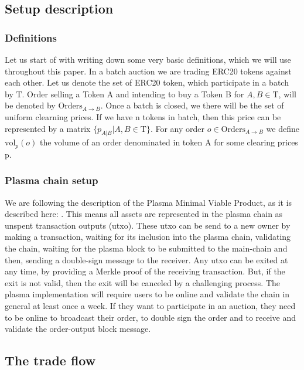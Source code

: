 \documentclass[11pt,parskip=full]{scrartcl}%
\newcommand{\Tau}{\mathrm{T}}
\begin{document}
\subsection{Setup description}

\subsubsection{Definitions}
Let us start of with writing down some very basic definitions, which we will use throughout this paper.
In a batch auction we are trading ERC20 tokens against each other. Let us denote the set of ERC20 token, which participate in a batch by $\Tau$. \newline
Order selling a Token A and intending to buy a Token B for $A,B\in \Tau$, will be denoted by $\text{Orders}_{A\rightarrow B}$. \newline
Once a batch is closed, we there will be the set of uniform clearning prices. If we have n tokens in batch, then this price can be represented by a matrix $\{p_{A|B}| A,B \in \Tau \}$. \newline
For any order $o \in \text{Orders}_{A\rightarrow B}$ we define $\text{vol}_p(o)$ the volume of an order denominated in token A for some clearing prices p.

\subsubsection{Plasma chain setup}
We are following the description of the Plasma Minimal Viable Product, as it is described here: \cite{MVP}. This means all assets are represented in the plasma chain as unspent transaction outputs (utxo). These utxo can be send to a new owner by making a transaction, waiting for its inclusion into the plasma chain, validating the chain, waiting for the plasma block to be submitted to the main-chain and then, sending a double-sign message to the receiver.
Any utxo can be exited at any time, by providing a Merkle proof of the receiving transaction. But, if the exit is not valid, then the exit will be canceled by a challenging process.
The plasma implementation will require users to be online and validate the chain in general at least once a week. If they want to participate in an auction, they need to be online to broadcast their order, to double sign the order and to receive and validate the order-output block message.




\subsection{The trade flow}
\label{subsec:data}
\end{document}
